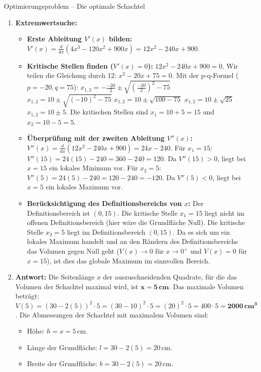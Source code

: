 \begin{loesungsumgebung}{Optimierungsproblem – Die optimale Schachtel}
\begin{enumerate}
    \item \textbf{Extremwertsuche:}
    \begin{itemize}
        \item \textbf{Erste Ableitung $V'(x)$ bilden:}
        $V'(x) = \frac{d}{dx}(4x^3 - 120x^2 + 900x) = 12x^2 - 240x + 900$.
        \item \textbf{Kritische Stellen finden ($V'(x)=0$):}
        $12x^2 - 240x + 900 = 0$.
        Wir teilen die Gleichung durch 12:
        $x^2 - 20x + 75 = 0$.
        Mit der p-q-Formel ($p=-20, q=75$):
        $x_{1,2} = - \frac{-20}{2} \pm \sqrt{\left(\frac{-20}{2}\right)^2 - 75}$
        $x_{1,2} = 10 \pm \sqrt{(-10)^2 - 75}$
        $x_{1,2} = 10 \pm \sqrt{100 - 75}$
        $x_{1,2} = 10 \pm \sqrt{25}$
        $x_{1,2} = 10 \pm 5$.
        Die kritischen Stellen sind $x_1 = 10 + 5 = 15$ und $x_2 = 10 - 5 = 5$.
        \item \textbf{Überprüfung mit der zweiten Ableitung $V''(x)$:}
        $V''(x) = \frac{d}{dx}(12x^2 - 240x + 900) = 24x - 240$.
        Für $x_1 = 15$: $V''(15) = 24(15) - 240 = 360 - 240 = 120$.
        Da $V''(15) > 0$, liegt bei $x=15$ ein lokales Minimum vor.
        Für $x_2 = 5$: $V''(5) = 24(5) - 240 = 120 - 240 = -120$.
        Da $V''(5) < 0$, liegt bei $x=5$ ein lokales Maximum vor.
        \item \textbf{Berücksichtigung des Definitionsbereichs von $x$:}
        Der Definitionsbereich ist $(0, 15)$.
        Die kritische Stelle $x_1=15$ liegt nicht im offenen Definitionsbereich (hier wäre die Grundfläche Null).
        Die kritische Stelle $x_2=5$ liegt im Definitionsbereich $(0,15)$. Da es sich um ein lokales Maximum handelt und an den Rändern des Definitionsbereichs das Volumen gegen Null geht ($V(x) \to 0$ für $x \to 0^+$ und $V(x) = 0$ für $x=15$), ist dies das globale Maximum im sinnvollen Bereich.
    \end{itemize}

    \item \textbf{Antwort:}
    Die Seitenlänge $x$ der auszuschneidenden Quadrate, für die das Volumen der Schachtel maximal wird, ist $\mathbf{x = 5\,cm}$.
    Das maximale Volumen beträgt:
    $V(5) = (30-2(5))^2 \cdot 5 = (30-10)^2 \cdot 5 = (20)^2 \cdot 5 = 400 \cdot 5 = \mathbf{2000\,cm^3}$.
    Die Abmessungen der Schachtel mit maximalem Volumen sind:
    \begin{itemize}
        \item Höhe: $h = x = 5\,$cm.
        \item Länge der Grundfläche: $l = 30 - 2(5) = 20\,$cm.
        \item Breite der Grundfläche: $b = 30 - 2(5) = 20\,$cm.
    \end{itemize}
\end{enumerate}

\end{loesungsumgebung}

